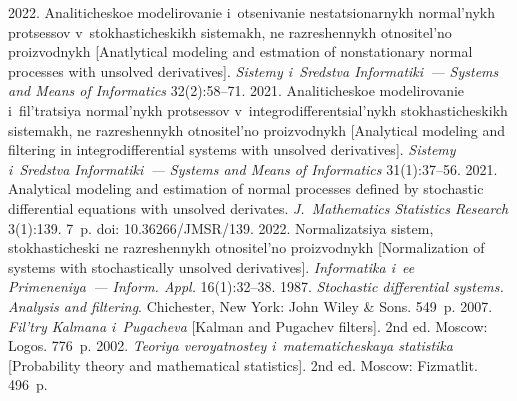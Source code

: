 







\vspace*{-7pt}

  \begin{multicols}{2}

\renewcommand{\bibname}{\protect\rmfamily References}

{\small\frenchspacing
 {%
 \begin{thebibliography}{9}
 2022. 
Analiticheskoe modelirovanie i~otsenivanie nestatsionarnykh normal'nykh protsessov 
v~stokhasticheskikh sistemakh, ne razreshennykh otnositel'no proizvodnykh
 [Anatlytical modeling and estmation of nonstationary normal processes with unsolved derivatives]. 
 \textit{Sistemy i~Sredstva Informatiki~--- Systems and Means of Informatics} 32(2):58--71.
 2021. Analiticheskoe modelirovanie 
i~fil't\-ra\-tsiya normal'nykh protsessov v~in\-teg\-ro\-dif\-fe\-ren\-tsi\-al'\-nykh stokhasticheskikh sistemakh, 
ne raz\-re\-shen\-nykh otnositel'no proizvodnykh [Analytical modeling and filtering in integrodifferential
 systems with unsolved derivatives]. \textit{Sistemy i~Sredstva Informatiki~--- 
 Systems and Means of Informatics} 31(1):37--56.
 2021. Analytical modeling and estimation of normal processes defined
 by stochastic differential equations with unsolved derivates. \textit{J.~Mathematics Statistics Research} 
 3(1):139. 7~p. doi: 10.36266/JMSR/139. 
 2022. Normalizatsiya sistem, stokhasticheski ne razreshennykh otnositel'no 
proizvodnykh [Normalization of systems with stochastically unsolved derivatives]. 
\textit{Informatika i~ee Primeneniya~--- Inform. Appl.} 16(1):32--38.
 1987. 
\textit{Stochastic differential systems. Analysis and filtering}. Chichester, New York: John Wiley \& Sons. 549~p.
 2007. 
\textit{Fil'try Kalmana i~Pugacheva} [Kalman and Pugachev filters]. 2nd ed. Moscow: Logos. 776~p.
 2002. 
\textit{Teoriya veroyatnostey i~ma\-te\-ma\-ti\-che\-skaya statistika} [Probability theory and mathematical statistics]. 
2nd ed. Moscow: Fizmatlit. 496~p.
  \end{thebibliography}

 }
 }

\end{multicols}

